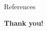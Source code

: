 \documentclass[8pt]{beamer}
\begin{document}
%
%
%
%
%
%
%
%    
%
%
%
%
%
%
%
%
%

\begin{frame}{References}


\end{frame}

\begin{frame}
\Large
\centering

{\bf Thank you!}
    
\end{frame}
\end{document}
